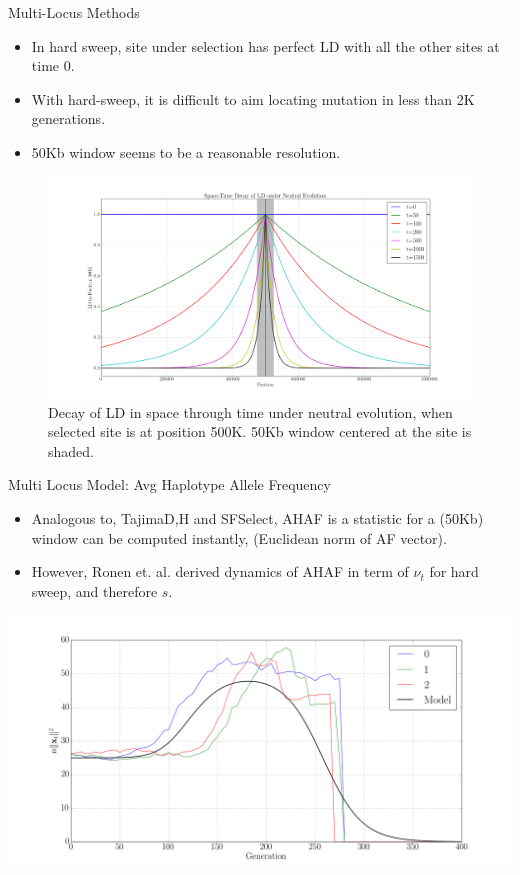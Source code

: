 \documentclass[t]{beamer} %
\begin{document}
\begin{frame}{Multi-Locus Methods}
\begin{itemize}
\item In hard sweep, site under selection has perfect LD with all the other sites at time 0.\item With hard-sweep, it is difficult to aim locating mutation in less than 2K generations.
\item 50Kb window seems to be a reasonable resolution.
\end{itemize}
\begin{figure}
\centering
\hspace{-0in}\includegraphics[scale=0.17]{spaceTimeLD}
\caption{Decay of LD in space through time under neutral evolution, when selected site is at position 500K. 50Kb window centered at the site is shaded.}

\end{figure}
\end{frame}

\begin{frame}{Multi Locus Model: Avg Haplotype Allele Frequency}
\begin{itemize}
\item Analogous to, TajimaD,H and SFSelect, AHAF is a statistic for a (50Kb) window can be computed instantly, (Euclidean norm of AF vector).
\item However, Ronen et. al. derived dynamics of AHAF in term of $\nu_t$ for hard sweep,  and therefore $s$.
\end{itemize}
\centering
\hspace{-0.1in}\includegraphics[scale=0.2]{haf}

\end{frame}
\end{document}
